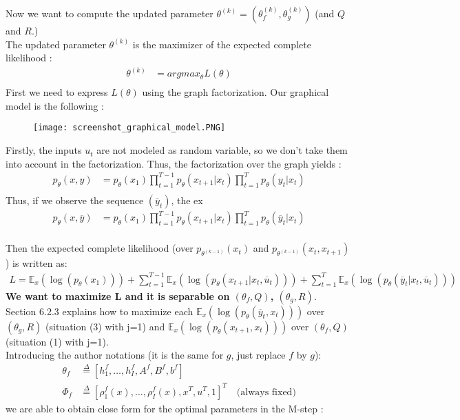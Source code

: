 Now we want to compute the updated parameter $\theta^{(k)} = (\theta_f^{(k)}, \theta_g^{(k)})$ (and $Q$ and $R$.)\\ 

The updated parameter $\theta^{(k)}$ is the maximizer of the expected complete likelihood :
\begin{align*}
  \theta^{(k)} &= argmax_{\theta}L(\theta)\\
\end{align*}
First we need to express $L(\theta)$ using the graph factorization.
Our graphical model is the following :
\begin{figure}[H]
	\texttt{[image: screenshot\_graphical\_model.PNG]}
\end{figure}
Firstly, the inputs $u_t$ are not modeled as random variable, so we don't take them into account in the factorization.
Thus, the factorization over the graph yields :
\begin{align*}
p_{\theta}(x,y) &= p_{\theta}(x_1) \prod_{t=1}^{T-1}{p_{\theta}(x_{t+1}|x_t)} \prod_{t=1}^{T}{p_{\theta}(y_t|x_t)}\\
\end{align*}
Thus, if we observe the sequence $(\overline{y}_t)$, the ex
\begin{align*}
  p_{\theta}(x,\overline{y}) &= p_{\theta}(x_1) \prod_{t=1}^{T-1}{p_{\theta}(x_{t+1}|x_t)} \prod_{t=1}^{T}{p_{\theta}(\overline{y}_t|x_t)}\\
\end{align*}

Then the expected complete likelihood (over $p_{\theta^{(k-1)}}(x_t)$ and $p_{\theta^{(k-1)}}(x_t,x_{t+1})$) is written as:
\begin{eqnarray}
L=\mathbb{E}_x(\log(p_{\theta}(x_1)))+\sum_{t=1}^{T-1}{\mathbb{E}_x(\log(p_{\theta}(x_{t+1}|x_t,\overline{u}_t)))}+\sum_{t=1}^{T}{\mathbb{E}_x(\log(p_{\theta}(\overline{y}_t|x_t,\overline{u}_t)))}\nonumber
\end{eqnarray}
\textbf{We want to maximize L and it is separable on $(\theta_f,Q)$, $(\theta_g,R)$}.\\

Section 6.2.3 explains how to maximize each $\mathbb{E}_x(\log(p_{\theta}(\overline{y}_t,x_t)))$ over $(\theta_g,R)$ (situation (3) with j=1) and $\mathbb{E}_x(\log(p_{\theta}(x_{t+1},x_t)))$ over $(\theta_f,Q)$ (situation (1) with j=1).\\
Introducing the author notations (it is the same for $g$, just replace $f$ by $g$): 
\begin{align*}
\theta_f & \overset{\Delta}{=} [h_1^f, \ldots, h_I^f, A^f, B^f, b^f] \\
\Phi_f & \overset{\Delta}{=} [\rho_1^f(x),\ldots, \rho_I^f(x), x^T, u^T, 1]^T \quad\text{(always fixed)} 
\end{align*}
we are able to obtain close form for the optimal parameters in the M-step :

